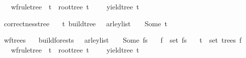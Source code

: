 \begin{isabellebody}
\ \ \ {\isachardoublequoteopen}wf{\isacharunderscore}{\kern0pt}rule{\isacharunderscore}{\kern0pt}tree\ {\isasymG}\ t\ {\isasymand}\ root{\isacharunderscore}{\kern0pt}tree\ t\ {\isacharequal}{\kern0pt}\ {\isasymSS}\ {\isasymG}\ {\isasymand}\ yield{\isacharunderscore}{\kern0pt}tree\ t\ {\isacharequal}{\kern0pt}\ {\isasymomega}{\isachardoublequoteclose}%
\isadelimproof
%
\endisadelimproof
%
\isatagproof
%
\endisatagproof
{\isafoldproof}%
%
\isadelimproof
%
\endisadelimproof
%
\begin{isamarkuptext}%
%
\end{isamarkuptext}\isamarkuptrue%
\isamarkupfalse%
\ correctness{\isacharunderscore}{\kern0pt}tree{\isacharcolon}{\kern0pt}\isanewline
\ \ \ {\isachardoublequoteopen}{\isacharparenleft}{\kern0pt}{\isasymexists}t{\isachardot}{\kern0pt}\ build{\isacharunderscore}{\kern0pt}tree\ {\isasymG}\ {\isasymomega}\ {\isacharparenleft}{\kern0pt}{\isasymE}arley{\isacharunderscore}{\kern0pt}list\ {\isasymG}\ {\isasymomega}{\isacharparenright}{\kern0pt}\ {\isacharequal}{\kern0pt}\ Some\ t{\isacharparenright}{\kern0pt}\ {\isasymlongleftrightarrow}\ {\isasymG}\ {\isasymturnstile}\ {\isacharbrackleft}{\kern0pt}{\isasymSS}\ {\isasymG}{\isacharbrackright}{\kern0pt}\ {\isasymRightarrow}\isactrlsup {\isacharasterisk}{\kern0pt}\ {\isasymomega}{\isachardoublequoteclose}%
\isadelimproof
%
\endisadelimproof
%
\isatagproof
%
\endisatagproof
{\isafoldproof}%
%
\isadelimproof
%
\endisadelimproof
%
\begin{isamarkuptext}%
%
\end{isamarkuptext}\isamarkuptrue%
\isamarkupfalse%
\ wf{\isacharunderscore}{\kern0pt}trees{\isacharcolon}{\kern0pt}\isanewline
\ \ \ {\isachardoublequoteopen}build{\isacharunderscore}{\kern0pt}forests\ {\isasymG}\ {\isasymomega}\ {\isacharparenleft}{\kern0pt}{\isasymE}arley{\isacharunderscore}{\kern0pt}list\ {\isasymG}\ {\isasymomega}{\isacharparenright}{\kern0pt}\ {\isacharequal}{\kern0pt}\ Some\ fs{\isachardoublequoteclose}\isanewline
\ \ \ {\isachardoublequoteopen}f\ {\isasymin}\ set\ fs{\isachardoublequoteclose}\isanewline
\ \ \ {\isachardoublequoteopen}t\ {\isasymin}\ set\ {\isacharparenleft}{\kern0pt}trees\ f{\isacharparenright}{\kern0pt}{\isachardoublequoteclose}\isanewline
\ \ \ {\isachardoublequoteopen}wf{\isacharunderscore}{\kern0pt}rule{\isacharunderscore}{\kern0pt}tree\ {\isasymG}\ t\ {\isasymand}\ root{\isacharunderscore}{\kern0pt}tree\ t\ {\isacharequal}{\kern0pt}\ {\isasymSS}\ {\isasymG}\ {\isasymand}\ yield{\isacharunderscore}{\kern0pt}tree\ t\ {\isacharequal}{\kern0pt}\ {\isasymomega}{\isachardoublequoteclose}%

\end{isabellebody}
